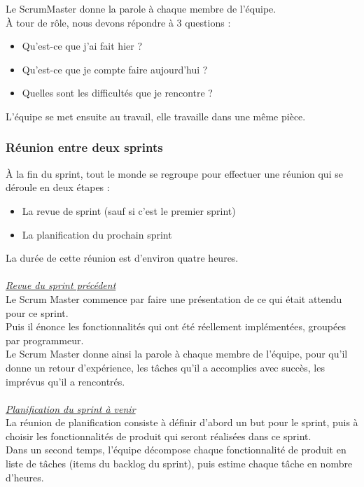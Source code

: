 Le ScrumMaster donne la parole à chaque membre de l'équipe.\\
À tour de rôle,  nous devons répondre à 3 questions :
\begin{itemize}
\item Qu'est-ce que j'ai fait hier ?
\item Qu'est-ce que je compte faire aujourd'hui ?
\item Quelles sont les difficultés que je rencontre ?\\
\end{itemize}
L'équipe se met ensuite au travail, elle travaille dans une même pièce.

\subsubsection{Réunion entre deux sprints}
À la fin du sprint, tout le monde se regroupe pour effectuer une réunion qui se
déroule en deux étapes :
\begin{itemize}
\item La revue de sprint (sauf si c'est le premier sprint)
\item La planification du prochain sprint\\
\end{itemize}

La durée de cette réunion est d'environ quatre heures.\\\\
\textit{\underline{Revue du sprint précédent}}\\

Le Scrum Master commence par faire une présentation de ce qui était attendu pour
ce sprint.\\
Puis il énonce les fonctionnalités qui ont été réellement implémentées, groupées
par programmeur.\\
Le Scrum Master donne ainsi la parole à chaque membre de l'équipe, pour qu'il
donne un retour d'expérience, les tâches qu'il a accomplies avec succès, les
imprévus qu'il a rencontrés.\\\\
\textit{\underline{Planification du sprint à venir}}\\

La réunion de planification consiste à définir d'abord
un but pour le sprint, puis à choisir les fonctionnalités de produit qui seront
réalisées dans ce sprint. \\

Dans un second temps, l'équipe décompose chaque fonctionnalité de produit en
liste de tâches (items du backlog du sprint), puis estime chaque tâche en
nombre d'heures. 

